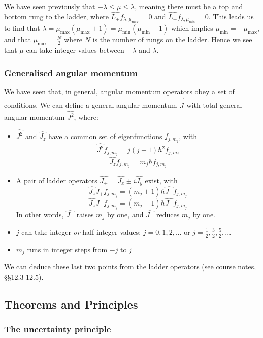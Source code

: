 We have seen previously that $-\lambda \leq \mu \leq \lambda$, meaning there must be a top and bottom rung to the ladder, where $\hat{L_+}f_{\lambda, \mu_\text{max}} = 0$ and $\hat{L_-}f_{\lambda, \mu_\text{min}} = 0$. This leads us to find that $\lambda = \mu_\text{max}(\mu_\text{max} + 1) = \mu_\text{min}(\mu_\text{min} - 1)$ which implies $\mu_\text{min} = -\mu_\text{max}$, and that $\mu_\text{max} = \frac{N}{2}$ where $N$ is the number of rungs on the ladder. Hence we see that $\mu$ can take integer values between $-\lambda$ and $\lambda$.

\subsubsection{Generalised angular momentum}

We have seen that, in general, angular momentum operators obey a set of conditions. We can define a general angular momentum $\vec{\hat{J}}$ with total general angular momentum $\hat{J^2}$, where:

\begin{itemize}
	\item $\hat{J^2}$ and $\hat{J_z}$ have a common set of eigenfunctions $f_{j,m_j}$, with \[ \hat{J^2}f_{j,m_j} = j(j+1)\hbar^2 f_{j,m_j} \] \[ \hat{J_z}f_{j,m_j} = m_j\hbar f_{j,m_j} \]
	\item A pair of ladder operators $\hat{J_\pm} = \hat{J_x} \pm i\hat{J_y}$ exist, with \[ \hat{J_z}\hat{J_+}f_{j,m_j} = (m_j + 1)\hbar \hat{J_+} f_{j,m_j} \] \[ \hat{J_z}\hat{J_-}f_{j,m_j} = (m_j - 1)\hbar \hat{J_-} f_{j,m_j} \] In other words, $\hat{J_+}$ raises $m_j$ by one, and $\hat{J_-}$ reduces $m_j$ by one.
	\item $j$ can take integer \emph{or} half-integer values: $j = 0, 1, 2, ...$ or $j = \frac{1}{2}, \frac{3}{2}, \frac{5}{2}, ...$
	\item $m_j$ runs in integer steps from $-j$ to $j$
\end{itemize}

We can deduce these last two points from the ladder operators (see course notes, §§12.3-12.5).

\subsection{Theorems and Principles}
\subsubsection{The uncertainty principle}

